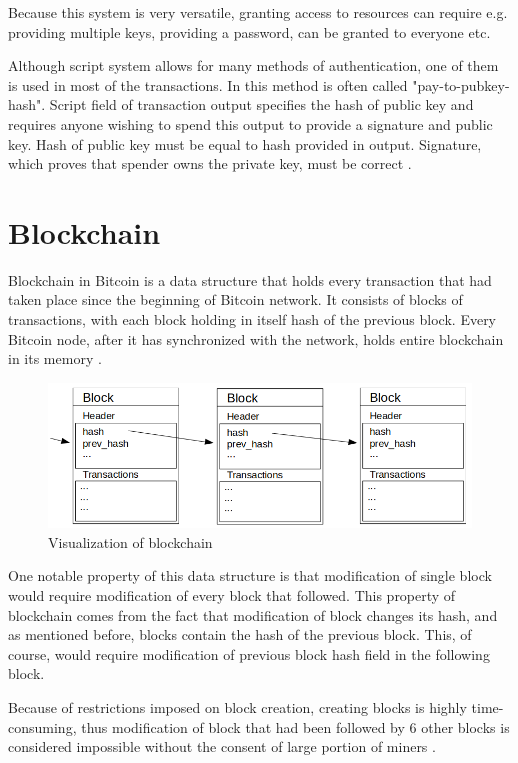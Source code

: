 \documentclass[12pt, en, eng, oneside, final]{mgr}
\begin{document}
Because this system is very versatile, granting access to resources can require e.g. providing multiple keys, providing a password, can be granted to everyone etc. 

Although script system allows for many methods of authentication, one of them is used in most of the transactions. In this method is often called "pay-to-pubkey-hash". Script field of transaction output specifies the hash of public key and requires anyone wishing to spend this output to provide a signature and public key. Hash of public key must be equal to hash provided in output. Signature, which proves that spender owns the private key, must be correct \cite{bitcoin-script}.


\section{Blockchain}
Blockchain in Bitcoin is a data structure that holds every transaction that had taken place since the beginning of Bitcoin network. It consists of blocks of transactions, with each block holding in itself hash of the previous block. Every Bitcoin node, after it has synchronized with the network, holds entire blockchain in its memory \cite{mastering-bitcoin}.

\begin{figure}[H]
  \includegraphics[width=0.8\linewidth]{blockchain.png}
  \caption{Visualization of blockchain}
  \label{fig:visualization-of-blockchain}
\end{figure}

One notable property of this data structure is that modification of single block would require modification of every block that followed. This property of blockchain comes from the fact that modification of block changes its hash, and as mentioned before, blocks contain the hash of the previous block. This, of course, would require modification of previous block hash field in the following block. 

Because of restrictions imposed on block creation, creating blocks is highly time-consuming, thus modification of block that had been followed by 6 other blocks is considered impossible without the consent of large portion of miners \cite{confirmation}.
\end{document}
